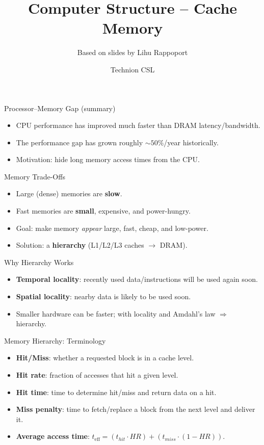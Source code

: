\documentclass[aspectratio=169,12pt]{beamer}
\title{Computer Structure -- Cache Memory}
\author{Based on slides by Lihu Rappoport}
\date{Technion CSL}
\begin{document}
\begin{frame}
  \titlepage
\end{frame}

\begin{frame}{Processor--Memory Gap (summary)}
\begin{itemize}
  \item CPU performance has improved much faster than DRAM latency/bandwidth.
  \item The performance gap has grown roughly $\sim 50\%$/year historically.
  \item Motivation: hide long memory access times from the CPU.
\end{itemize}
\end{frame}

\begin{frame}{Memory Trade-Offs}
\begin{itemize}
  \item Large (dense) memories are \textbf{slow}.
  \item Fast memories are \textbf{small}, expensive, and power-hungry.
  \item Goal: make memory \emph{appear} large, fast, cheap, and low-power.
  \item Solution: a \textbf{hierarchy} (L1/L2/L3 caches $\rightarrow$ DRAM).
\end{itemize}
\end{frame}

\begin{frame}{Why Hierarchy Works}
\begin{itemize}
  \item \textbf{Temporal locality}: recently used data/instructions will be used again soon.
  \item \textbf{Spatial locality}: nearby data is likely to be used soon.
  \item Smaller hardware can be faster; with locality and Amdahl's law $\Rightarrow$ hierarchy.
\end{itemize}
\end{frame}

\begin{frame}{Memory Hierarchy: Terminology}
\begin{itemize}
  \item \textbf{Hit/Miss}: whether a requested block is in a cache level.
  \item \textbf{Hit rate}: fraction of accesses that hit a given level.
  \item \textbf{Hit time}: time to determine hit/miss and return data on a hit.
  \item \textbf{Miss penalty}: time to fetch/replace a block from the next level and deliver it.
  \item \textbf{Average access time}: $t_{\text{eff}}=(t_{hit} \cdot HR) + (t_{miss} \cdot (1-HR))$.
\end{itemize}
\end{frame}
\end{document}
